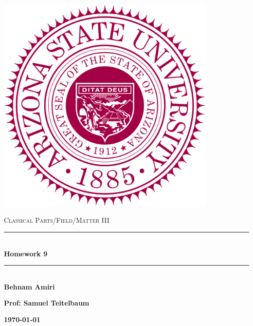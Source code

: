 \documentclass[fleqn]{article}
\begin{document}
  \begin{titlepage}

    \newcommand{\HRule}{\rule{\linewidth}{0.5mm}}

    \center

    \begin{center}
      \includegraphics[height=11cm, width=11cm]{asu.png}
    \end{center}

    \vline

    \textsc{\LARGE Classical Parts/Field/Matter III}\\[1.5cm]

    \HRule \\[0.5cm]
    { \huge \bfseries Homework 9}\\[0.4cm] 
    \HRule \\[1.0cm]

    \textbf{Behnam Amiri}

    \bigbreak

    \textbf{Prof: Samuel Teitelbaum}

    \bigbreak

    \textbf{{\large \today}\\[2cm]}

    \vfill

  \end{titlepage}
\end{document}
